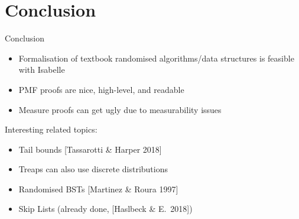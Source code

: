 \documentclass[%
	sans,
	12pt,
]{beamer}
\begin{document}
\section{Conclusion}
\begin{frame}{Conclusion}
\begin{itemize}
\item Formalisation of textbook randomised algorithms/data structures is feasible with Isabelle\pause
\item PMF proofs are nice, high-level, and readable\pause
\item Measure proofs can get ugly due to measurability issues\pause
\end{itemize}
Interesting related topics:\pause
\begin{itemize}
\item Tail bounds [Tassarotti \& Harper 2018]\pause
\item Treaps can also use discrete distributions\pause
\item Randomised BSTs [Martinez \& Roura 1997]\pause
\item Skip Lists (already done, [Haslbeck \& E.\ 2018])
\end{itemize}
\end{frame}
\end{document}
